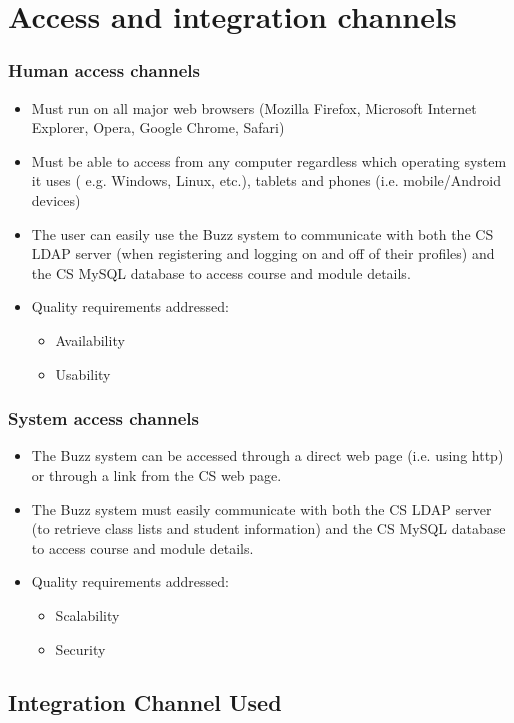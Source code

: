 \documentclass[12pt, oneside]{article}
\begin{document}
\section{Access and integration channels}
	\subsubsection{Human access channels}
		\begin{itemize}
			\item Must run on all major web browsers (Mozilla Firefox, Microsoft Internet Explorer, Opera, Google Chrome, Safari)
			\item Must be able to access from any computer regardless which operating system it uses ( e.g. Windows, Linux, etc.), tablets and phones (i.e. mobile/Android devices)
			\item The user can easily use the Buzz system to communicate with both the CS LDAP server (when registering and logging on and off of their profiles) and the CS MySQL database to access course and module details.
			\item Quality requirements addressed:
				\begin{itemize}
					\item Availability
					\item Usability
				\end{itemize}
		\end{itemize}
		\subsubsection{System access channels}
			\begin{itemize}
				\item The Buzz system can be accessed through a direct web page (i.e. using http) or through a link from the CS web page.
				\item The Buzz system must easily communicate with both the CS LDAP server (to retrieve class lists and student information) and the CS MySQL database to access course and module details.
					\item Quality requirements addressed:
				\begin{itemize}
					\item Scalability
					\item Security
				\end{itemize}
			\end{itemize}
	\subsection{Integration Channel Used}
\end{document}
